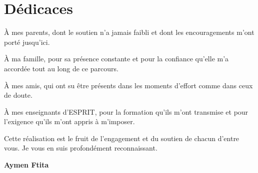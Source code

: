 \chapter*{Dédicaces}

\vspace{0.8cm}

À mes parents, dont le soutien n'a jamais faibli et dont les encouragements m'ont porté
jusqu'ici.

À ma famille, pour sa présence constante et pour la confiance qu'elle m'a accordée
tout au long de ce parcours.

À mes amis, qui ont su être présents dans les moments d'effort comme dans ceux de
doute.

À mes enseignants d'ESPRIT, pour la formation qu'ils m'ont transmise et pour
l'exigence qu'ils m'ont appris à m'imposer.

Cette réalisation est le fruit de l'engagement et du soutien de chacun d'entre vous.
Je vous en suis profondément reconnaissant.

\vspace{1.4cm}
\begin{flushright}
\textbf{Aymen Ftita}
\end{flushright}
